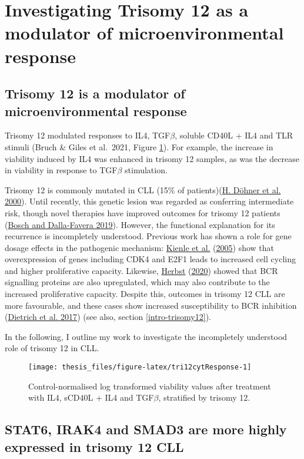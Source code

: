 \documentclass[11pt, a4paper, twosided]{book}
\begin{document}
\hypertarget{investigating-trisomy-12-as-a-modulator-of-microenvironmental-response}{%
\section{Investigating Trisomy 12 as a modulator of microenvironmental response}\label{investigating-trisomy-12-as-a-modulator-of-microenvironmental-response}}

\hypertarget{trisomy12-modulator}{%
\subsection{Trisomy 12 is a modulator of microenvironmental response}\label{trisomy12-modulator}}

Trisomy 12 modulated responses to IL4, TGF\(\beta\), soluble CD40L + IL4 and TLR stimuli (Bruch \& Giles et al.~2021, Figure \ref{fig:tri12cytResponse}). For example, the increase in viability induced by IL4 was enhanced in trisomy 12 samples, as was the decrease in viability in response to TGF\(\beta\) stimulation.

Trisomy 12 is commonly mutated in CLL (15\% of patients)(\protect\hyperlink{ref-Dohner2000}{H. Döhner et al. 2000}). Until recently, this genetic lesion was regarded as conferring intermediate risk, though novel therapies have improved outcomes for trisomy 12 patients (\protect\hyperlink{ref-Bosch2019}{Bosch and Dalla-Favera 2019}). However, the functional explanation for its recurrence is incompletely understood. Previous work has shown a role for gene dosage effects in the pathogenic mechanism: \protect\hyperlink{ref-Kienle2005}{Kienle et al.} (\protect\hyperlink{ref-Kienle2005}{2005}) show that overexpression of genes including CDK4 and E2F1 leads to increased cell cycling and higher proliferative capacity. Likewise, \protect\hyperlink{ref-HerbstThesis}{Herbst} (\protect\hyperlink{ref-HerbstThesis}{2020}) showed that BCR signalling proteins are also upregulated, which may also contribute to the increased proliferative capacity. Despite this, outcomes in trisomy 12 CLL are more favourable, and these cases show increased susceptibility to BCR inhibition (\protect\hyperlink{ref-JCIpaper}{Dietrich et al. 2017}) (see also, section \ref{intro-trisomy12}).

In the following, I outline my work to investigate the incompletely understood role of trisomy 12 in CLL.


\begin{figure}

{\centering \texttt{[image: thesis\_files/figure-latex/tri12cytResponse-1]} 

}

\caption{Control-normalised log transformed viability values after treatment with IL4, sCD40L + IL4 and TGF\(\beta\), stratified by trisomy 12.}\label{fig:tri12cytResponse}
\end{figure}
\hypertarget{gene-dosage-effects}{%
\subsection{STAT6, IRAK4 and SMAD3 are more highly expressed in trisomy 12 CLL}\label{gene-dosage-effects}}
\end{document}
